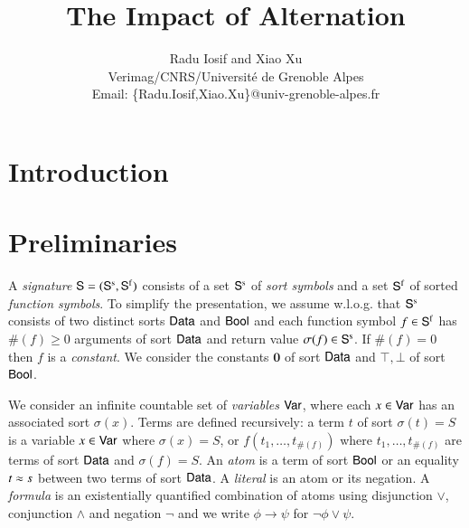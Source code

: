 \documentclass[10pt,conference,letterpaper,twocolumn]{IEEEtran}
\begin{document}

\title{The Impact of Alternation}

\author{Radu Iosif and Xiao Xu \\
Verimag/CNRS/Universit\'e de Grenoble Alpes\\
Email: \{Radu.Iosif,Xiao.Xu\}@univ-grenoble-alpes.fr}

\maketitle

\begin{abstract}
\end{abstract}

\section{Introduction}

\section{Preliminaries}

A \emph{signature} $\mathsf{S} = (\mathsf{S}^\mathrm{s},\mathsf{S}^\mathrm{f})$ consists of a
set $\mathsf{S}^\mathrm{s}$ of \emph{sort symbols} and a set $\mathsf{S}^\mathrm{f}$ of
sorted \emph{function symbols}. To simplify the presentation, we
assume w.l.o.g. that $\mathsf{S}^\mathrm{s}$ consists of two distinct sorts
$\mathsf{Data}$ and $\mathsf{Bool}$ and each function symbol $f \in \mathsf{S}^\mathrm{f}$ has
$\#(f) \geq 0$ arguments of sort $\mathsf{Data}$ and return value $\sigma(f)
\in \mathsf{S}^\mathrm{s}$. If $\#(f)=0$ then $f$ is a \emph{constant}. We
consider the constants $\mathbf{0}$ of sort $\mathsf{Data}$ and $\top,\bot$ of
sort $\mathsf{Bool}$.

We consider an infinite countable set of \emph{variables} $\mathsf{Var}$,
where each $x \in \mathsf{Var}$ has an associated sort $\sigma(x)$. Terms are
defined recursively: a term $t$ of sort $\sigma(t)=S$ is a variable $x
\in \mathsf{Var}$ where $\sigma(x)=S$, or $f(t_1,\ldots,t_{\#(f)})$ where
$t_1,\ldots,t_{\#(f)}$ are terms of sort $\mathsf{Data}$ and $\sigma(f)=S$. An
\emph{atom} is a term of sort $\mathsf{Bool}$ or an equality $t \approx s$
between two terms of sort $\mathsf{Data}$. A \emph{literal} is an atom or its
negation. A \emph{formula} is an existentially quantified combination
of atoms using disjunction $\vee$, conjunction $\wedge$ and negation
$\neg$ and we write $\phi \rightarrow \psi$ for $\neg\phi \vee \psi$.
\end{document}
